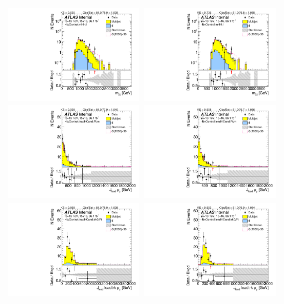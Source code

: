\begin{figure}[htbp!]
\begin{center}
\includegraphics[angle=270, width=0.31\textwidth]{./figures/boosted/Prereweight/Moriond_FourTag_Control_mHH_l_1.pdf}
\includegraphics[angle=270, width=0.31\textwidth]{./figures/boosted/Control/b77_FourTag_Control_mHH_l_1.pdf}\\
\includegraphics[angle=270, width=0.31\textwidth]{./figures/boosted/Prereweight/Moriond_FourTag_Control_leadHCand_Pt_m.pdf}
\includegraphics[angle=270, width=0.31\textwidth]{./figures/boosted/Control/b77_FourTag_Control_leadHCand_Pt_m.pdf}\\
\includegraphics[angle=270, width=0.31\textwidth]{./figures/boosted/Prereweight/Moriond_FourTag_Control_leadHCand_trk0_Pt.pdf}
\includegraphics[angle=270, width=0.31\textwidth]{./figures/boosted/Control/b77_FourTag_Control_leadHCand_trk0_Pt.pdf}\\

\end{center}
\end{figure}

